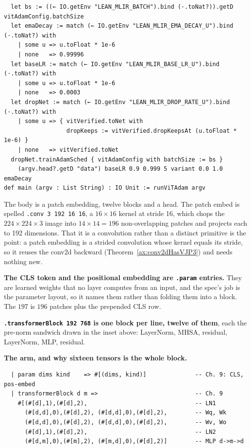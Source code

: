 \begin{verbatim}
  let bs := ((← IO.getEnv "LEAN_MLIR_BATCH").bind (·.toNat?)).getD vitAdamConfig.batchSize
  let emaDecay := match (← IO.getEnv "LEAN_MLIR_EMA_DECAY_U").bind (·.toNat?) with
    | some u => u.toFloat * 1e-6
    | none   => 0.99996
  let baseLR := match (← IO.getEnv "LEAN_MLIR_BASE_LR_U").bind (·.toNat?) with
    | some u => u.toFloat * 1e-6
    | none   => 0.0003
  let dropNet := match (← IO.getEnv "LEAN_MLIR_DROP_RATE_U").bind (·.toNat?) with
    | some u => { vitVerified.toNet with
                  dropKeeps := vitVerified.dropKeepsAt (u.toFloat * 1e-6) }
    | none   => vitVerified.toNet
  dropNet.trainAdamSched { vitAdamConfig with batchSize := bs }
    (argv.head?.getD "data") baseLR 0.9 0.999 5 variant 0.0 1.0 emaDecay
def main (argv : List String) : IO Unit := runViTAdam argv
\end{verbatim}

\noindent The body is a patch embedding, twelve blocks and a head. The
patch embed is spelled \texttt{.conv 3 192 16 16}, a $16 \times 16$
kernel at stride 16, which chops the $224 \times 224 \times 3$ image
into $14 \times 14 = 196$ non-overlapping patches and projects each to
192 dimensions. That it is a convolution rather than a distinct
primitive is the point: a patch embedding is a strided
convolution whose kernel equals its stride, so it reuses the conv2d backward (Theorem~\ref{ax:conv2dHasVJP3}) and needs
nothing new.

\textbf{The CLS token and the positional embedding are
\texttt{.param} entries.} They are learned weights that no layer
computes from an input, and the spec's job is the parameter
layout, so it names them rather than folding them into a block. The
$197$ is $196$ patches plus the prepended CLS row.

\textbf{\texttt{.transformerBlock 192 768} is one block per line, twelve
of them}, each the pre-norm sandwich drawn in the inset above: LayerNorm,
MHSA, residual, LayerNorm, MLP, residual.

\textbf{The arm, and why sixteen tensors is the whole block.}

\begin{verbatim}
  | param dims kind    => #[(dims, kind)]              -- Ch. 9: CLS, pos-embed
  | transformerBlock d m =>                            -- Ch. 9
    #[(#[d],1),(#[d],2),                               -- LN1
      (#[d,d],0),(#[d],2), (#[d,d],0),(#[d],2),        -- Wq, Wk
      (#[d,d],0),(#[d],2), (#[d,d],0),(#[d],2),        -- Wv, Wo
      (#[d],1),(#[d],2),                               -- LN2
      (#[d,m],0),(#[m],2), (#[m,d],0),(#[d],2)]        -- MLP d->m->d
\end{verbatim}

